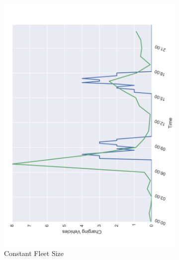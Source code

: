 \documentclass[12pt,a4paper]{article}
\begin{document}
\begin{figure}
\label{compare2}
  \centering
\begin{subfigure}[b]{0.452\textwidth}
  \includegraphics[width=\linewidth]{./images/charge}
  \caption{Constant Fleet Size}
  \label{constantfs}
\end{subfigure}
\begin{subfigure}[b]{0.45\textwidth}

\end{subfigure}
\end{figure}
\end{document}
